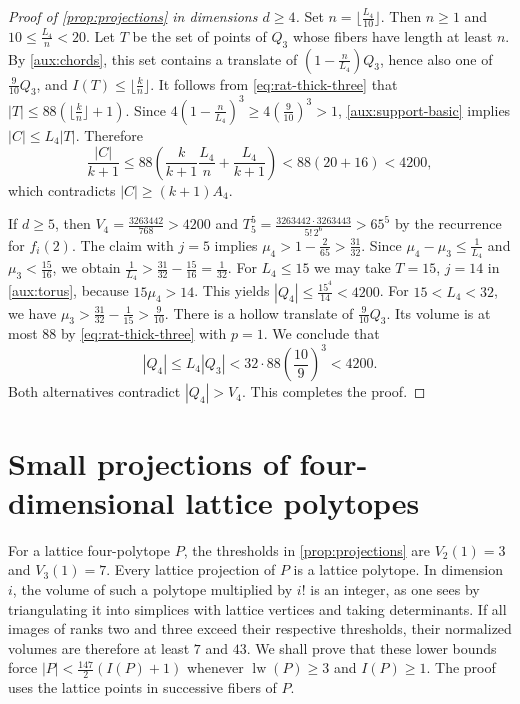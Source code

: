 \documentclass[reqno, 11pt]{article}
\numberwithin{equation}{section}
\theoremstyle{definition}
\DeclareMathOperator{\lw}{lw}
\begin{document}
\begin{proof}[Proof of \cref{prop:projections} in dimensions $d\ge4$]
Set $n=\lfloor\frac{L_4}{10}\rfloor$. Then $n\ge1$ and
$10\le\frac{L_4}{n}<20$. Let $T$ be the set of points of $Q_3$
whose fibers have length at least $n$. By \cref{aux:chords}, this
set contains a translate of $(1-\frac{n}{L_4})Q_3$, hence also one
of $\frac{9}{10}Q_3$, and $I(T)\le\lfloor\frac{k}{n}\rfloor$.
It follows from \eqref{eq:rat-thick-three} that
$|T|\le88(\lfloor\frac{k}{n}\rfloor+1)$. Since
$4(1-\frac{n}{L_4})^3\ge4(\frac{9}{10})^3>1$,
\eqref{aux:support-basic} implies $|C|\le L_4|T|$. Therefore
\[
 \frac{|C|}{k+1}\le88\left(\frac{k}{k+1}\frac{L_4}{n}+
                              \frac{L_4}{k+1}\right)
        <88(20+16)<4200,
\]
which contradicts $|C|\ge(k+1)A_4$.

If $d\ge5$, then $V_4=\frac{3263442}{768}>4200$ and
$T_5^5=\frac{3263442\cdot3263443}{5!\,2^6}>65^5$ by the recurrence
for $f_i(2)$. The claim with $j=5$ implies
$\mu_4>1-\frac{2}{65}>\frac{31}{32}$. Since
$\mu_4-\mu_3\le\frac{1}{L_4}$ and $\mu_3<\frac{15}{16}$, we obtain
$\frac{1}{L_4}>\frac{31}{32}-\frac{15}{16}=\frac{1}{32}$.
For $L_4\le15$ we may take $T=15$, $j=14$ in \cref{aux:torus},
because $15\mu_4>14$. This yields $|Q_4|\le\frac{15^4}{14}<4200$.
For $15<L_4<32$, we have $\mu_3>\frac{31}{32}-\frac{1}{15}>
\frac{9}{10}$. There is a hollow translate of $\frac{9}{10}Q_3$.
Its volume is at most $88$ by \eqref{eq:rat-thick-three} with $p=1$.
We conclude that
\[
 |Q_4|\le L_4|Q_3|<
       32\cdot88\left(\frac{10}{9}\right)^3<4200.
\]
Both alternatives contradict $|Q_4|>V_4$. This completes the proof.
\end{proof}

\section{Small projections of four-dimensional lattice polytopes}\label{sec:gzpw-four-chords}

For a lattice four-polytope $P$, the thresholds in \cref{prop:projections}
are $V_2(1)=3$ and $V_3(1)=7$. Every lattice projection of $P$ is a
lattice polytope. In dimension $i$, the volume of such a polytope
multiplied by $i!$ is an integer, as one sees by triangulating it
into simplices with lattice vertices and taking determinants.
If all images of ranks two and three exceed their respective thresholds,
their normalized volumes are therefore at least $7$ and $43$.
We shall prove that these lower bounds force
$|P|<\frac{147}{2}(I(P)+1)$ whenever $\lw(P)\ge3$ and $I(P)\ge1$.
The proof uses the lattice points in successive fibers of $P$.
\end{document}
